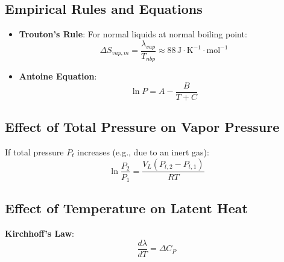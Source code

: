 \subsection{Empirical Rules and Equations}
\begin{itemize}
    \item \textbf{Trouton's Rule}: For normal liquids at normal boiling point:
    \begin{equation}
        \Delta S_{vap,m} = \frac{\lambda_{vap}}{T_{nbp}} \approx 88 \, \text{J}\cdot\text{K}^{-1}\cdot\text{mol}^{-1}
    \end{equation}
    \item \textbf{Antoine Equation}:
    \begin{equation}
        \ln P = A - \frac{B}{T + C}
    \end{equation}
\end{itemize}

\subsection{Effect of Total Pressure on Vapor Pressure}
If total pressure $P_t$ increases (e.g., due to an inert gas):
\begin{equation}
    \ln \frac{P_2}{P_1} = \frac{V_L (P_{t,2} - P_{t,1})}{RT}
\end{equation}

\subsection{Effect of Temperature on Latent Heat}
\textbf{Kirchhoff's Law}:
\begin{equation}
    \frac{d\lambda}{dT} = \Delta C_P
\end{equation}
\vspace{0.2cm}

